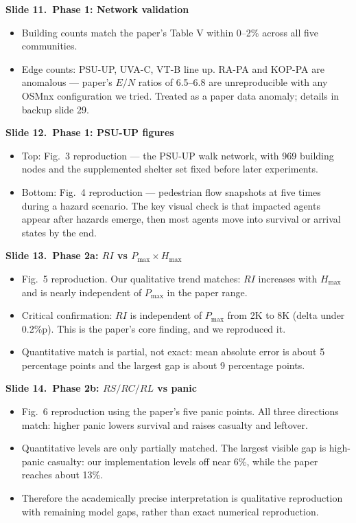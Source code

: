 \documentclass[11pt]{article}
\newcommand{\slide}[2]{\vspace{0.6em}\noindent\textbf{Slide #1.\ #2}\par\nopagebreak\vspace{0.1em}}
\begin{document}
\slide{11}{Phase 1: Network validation}
\begin{itemize}
\item Building counts match the paper's Table V within 0--2\% across all five communities.
\item Edge counts: PSU-UP, UVA-C, VT-B line up. RA-PA and KOP-PA are anomalous --- paper's $E/N$ ratios of 6.5--6.8 are unreproducible with any OSMnx configuration we tried. Treated as a paper data anomaly; details in backup slide 29.
\end{itemize}

\slide{12}{Phase 1: PSU-UP figures}
\begin{itemize}
\item Top: Fig.\ 3 reproduction --- the PSU-UP walk network, with 969 building nodes and the supplemented shelter set fixed before later experiments.
\item Bottom: Fig.\ 4 reproduction --- pedestrian flow snapshots at five times during a hazard scenario. The key visual check is that impacted agents appear after hazards emerge, then most agents move into survival or arrival states by the end.
\end{itemize}

\slide{13}{Phase 2a: $RI$ vs $P_{\max} \times H_{\max}$}
\begin{itemize}
\item Fig.\ 5 reproduction. Our qualitative trend matches: $RI$ increases with $H_{\max}$ and is nearly independent of $P_{\max}$ in the paper range.
\item Critical confirmation: $RI$ is independent of $P_{\max}$ from 2K to 8K (delta under 0.2\%p). This is the paper's core finding, and we reproduced it.
\item Quantitative match is partial, not exact: mean absolute error is about 5 percentage points and the largest gap is about 9 percentage points.
\end{itemize}

\slide{14}{Phase 2b: $RS / RC / RL$ vs panic}
\begin{itemize}
\item Fig.\ 6 reproduction using the paper's five panic points. All three directions match: higher panic lowers survival and raises casualty and leftover.
\item Quantitative levels are only partially matched. The largest visible gap is high-panic casualty: our implementation levels off near 6\%, while the paper reaches about 13\%.
\item Therefore the academically precise interpretation is qualitative reproduction with remaining model gaps, rather than exact numerical reproduction.
\end{itemize}
\end{document}
